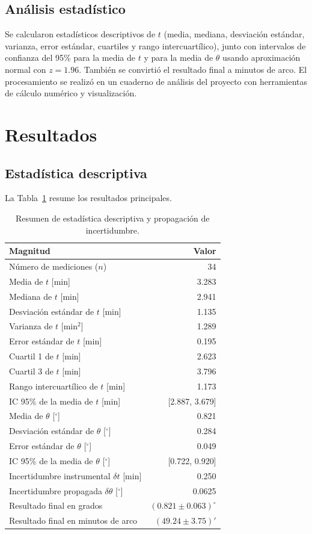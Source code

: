 \documentclass[stu,12pt,floatsintext]{apa7}
\begin{document}
\subsection{Análisis estadístico}
Se calcularon estadísticos descriptivos de $t$ (media, mediana, desviación estándar, varianza, error estándar, cuartiles y rango intercuartílico), junto con intervalos de confianza del 95\% para la media de $t$ y para la media de $\theta$ usando aproximación normal con $z=1.96$. También se convirtió el resultado final a minutos de arco. El procesamiento se realizó en un cuaderno de análisis del proyecto con herramientas de cálculo numérico y visualización.

\section{Resultados}
\subsection{Estadística descriptiva}
La Tabla~\ref{tab:descriptivos} resume los resultados principales.

\begin{table}[H]
\caption{Resumen de estadística descriptiva y propagación de incertidumbre.}
\centering
\begin{tabular}{lr}
\toprule
Magnitud & Valor \\
\midrule
Número de mediciones ($n$) & 34 \\
Media de $t$ [min] & 3.283 \\
Mediana de $t$ [min] & 2.941 \\
Desviación estándar de $t$ [min] & 1.135 \\
Varianza de $t$ [min$^2$] & 1.289 \\
Error estándar de $t$ [min] & 0.195 \\
Cuartil 1 de $t$ [min] & 2.623 \\
Cuartil 3 de $t$ [min] & 3.796 \\
Rango intercuartílico de $t$ [min] & 1.173 \\
IC 95\% de la media de $t$ [min] & [2.887, 3.679] \\
Media de $\theta$ [$^\circ$] & 0.821 \\
Desviación estándar de $\theta$ [$^\circ$] & 0.284 \\
Error estándar de $\theta$ [$^\circ$] & 0.049 \\
IC 95\% de la media de $\theta$ [$^\circ$] & [0.722, 0.920] \\
Incertidumbre instrumental $\delta t$ [min] & 0.250 \\
Incertidumbre propagada $\delta\theta$ [$^\circ$] & 0.0625 \\
Resultado final en grados & $(0.821 \pm 0.063)^\circ$ \\
Resultado final en minutos de arco & $(49.24 \pm 3.75)'$ \\
\bottomrule
\end{tabular}
\label{tab:descriptivos}
\end{table}
\end{document}

